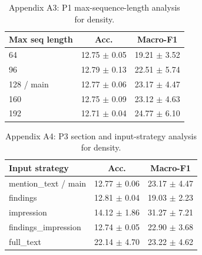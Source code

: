 \begin{table}[htbp]
\centering
\small
\caption{Appendix A3: P1 max-sequence-length analysis for density.}
\label{tab:appendix-p1-max-seq-length}
\begin{tabular}{lcc}
\hline
Max seq length & Acc. & Macro-F1 \\
\hline
64 & 12.75 $\pm$ 0.05 & 19.21 $\pm$ 3.52 \\
96 & 12.79 $\pm$ 0.13 & 22.51 $\pm$ 5.74 \\
128 / main & 12.77 $\pm$ 0.06 & 23.17 $\pm$ 4.47 \\
160 & 12.75 $\pm$ 0.09 & 23.12 $\pm$ 4.63 \\
192 & 12.71 $\pm$ 0.04 & 24.77 $\pm$ 6.10 \\
\hline
\end{tabular}
\end{table}

\begin{table}[htbp]
\centering
\small
\caption{Appendix A4: P3 section and input-strategy analysis for density.}
\label{tab:appendix-p3-section-input}
\begin{tabular}{lcc}
\hline
Input strategy & Acc. & Macro-F1 \\
\hline
mention\_text / main & 12.77 $\pm$ 0.06 & 23.17 $\pm$ 4.47 \\
findings & 12.81 $\pm$ 0.04 & 19.03 $\pm$ 2.23 \\
impression & 14.12 $\pm$ 1.86 & 31.27 $\pm$ 7.21 \\
findings\_impression & 12.74 $\pm$ 0.05 & 22.90 $\pm$ 3.68 \\
full\_text & 22.14 $\pm$ 4.70 & 23.22 $\pm$ 4.62 \\
\hline
\end{tabular}
\end{table}
